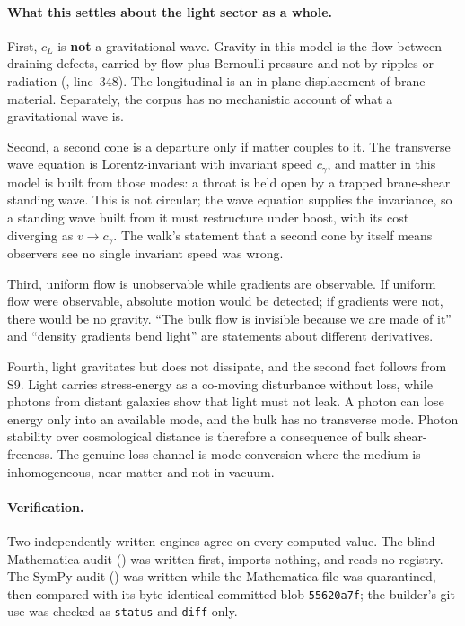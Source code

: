 \paragraph{What this settles about the light sector as a whole.}
First, \(c_L\) is \textbf{not} a gravitational wave. Gravity in this model is
the flow between draining defects, carried by flow plus Bernoulli pressure and
not by ripples or radiation
(, line~348). The longitudinal is an
in-plane displacement of brane material. Separately, the corpus has no
mechanistic account of what a gravitational wave is.

Second, a second cone is a departure only if matter couples to it. The
transverse wave equation is Lorentz-invariant with invariant speed
\(c_\gamma\), and matter in this model is built from those modes: a throat is
held open by a trapped brane-shear standing wave. This is not circular; the
wave equation supplies the invariance, so a standing wave built from it must
restructure under boost, with its cost diverging as \(v\to c_\gamma\). The
walk's statement that a second cone by itself means observers see no single
invariant speed was wrong.

Third, uniform flow is unobservable while gradients are observable. If uniform
flow were observable, absolute motion would be detected; if gradients were
not, there would be no gravity. ``The bulk flow is invisible because we are
made of it'' and ``density gradients bend light'' are statements about
different derivatives.

Fourth, light gravitates but does not dissipate, and the second fact follows
from S9. Light carries stress-energy as a co-moving disturbance without loss,
while photons from distant galaxies show that light must not leak. A photon
can lose energy only into an available mode, and the bulk has no transverse
mode. Photon stability over cosmological distance is therefore a consequence
of bulk shear-freeness. The genuine loss channel is mode conversion where the
medium is inhomogeneous, near matter and not in vacuum.

\paragraph{Verification.}
Two independently written engines agree on every computed value. The blind
Mathematica audit
()
was written first, imports nothing, and reads no registry. The SymPy audit
()
was written while the Mathematica file was quarantined, then compared with its
byte-identical committed blob \texttt{55620a7f}; the builder's git use was
checked as \texttt{status} and \texttt{diff} only.

